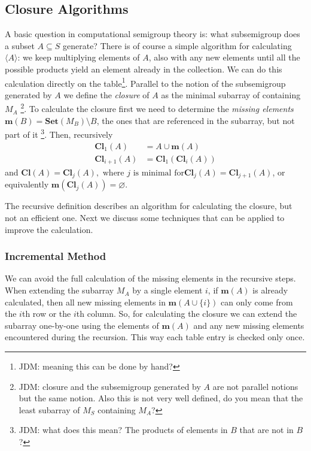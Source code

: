\documentclass{amsart}
\newcommand{\Set}{\mathbf{Set}}
\newcommand{\Miss}{\mathbf{m}}
\newcommand{\Closure}{\mathbf{Cl}}
\theoremstyle{plain}
\theoremstyle{definition}
\begin{document}
\subsection{Closure Algorithms}
A basic question in computational semigroup theory is: what subsemigroup does a subset $A\subseteq S$ generate?
There is of course a simple algorithm for calculating $\langle A\rangle$: we keep multiplying elements of $A$, also with any new elements until all the possible products yield an element already in the collection.
We can do this calculation directly on the table\footnote{JDM: meaning this can
be done by hand?}. 
Parallel to the notion of the subsemigroup generated by $A$ we define the
\emph{closure} of $A$ as the minimal subarray of containing $M_A$
\footnote{JDM: closure and the subsemigroup generated by $A$ are not parallel
  notions but the same notion. Also this is not very well defined, do you mean
that the least subarray of $M_S$ containing $M_A$?}.  To calculate
the closure first we need to determine the \emph{missing elements}
$\Miss(B)=\Set(M_B)\setminus B$, the ones that are referenced in the
subarray,
but not part of it \footnote{JDM: what does this mean? The products of elements in
$B$ that are not in $B$?}.  Then, recursively \begin{align*}
\Closure_1(A)&=A\cup\Miss(A)\\ \Closure_{i+1}(A)&=\Closure_1(\Closure_{i}(A))
\end{align*} and $ \Closure(A)=\Closure_j(A), \text{ where $j$ is minimal for
}\Closure_j(A)=\Closure_{j+1}(A)$, or equivalently
$\Miss(\Closure_j(A))=\varnothing$.

The recursive definition describes an algorithm for calculating the closure, but not an efficient one. Next we discuss some techniques that can be applied to improve the calculation.

\subsubsection{Incremental Method}
We can avoid the full calculation of the missing elements in the recursive steps.
When extending the subarray $M_A$ by a single element $i$, if $\Miss(A)$ is already calculated, then all new missing elements in $\Miss(A\cup\{i\})$ can only come from the $i$th row or the $i$th column.
So, for calculating the closure we can extend the subarray one-by-one using the elements of $\Miss(A)$ and any new missing elements encountered during the recursion.
This way each table entry is checked only once.
\end{document}
